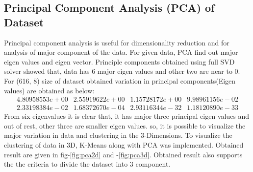 \documentclass[preprint,12pt]{elsarticle}
\begin{document}
						\subsection{Principal Component Analysis (PCA) of Dataset}  
								Principal component analysis is useful for dimensionality reduction and for analysis of major component of the data. For given data, PCA find out major eigen values and eigen vector. Principle components obtained using full SVD solver showed that, data has 6 major eigen values and other two are near to 0. For (616, 8) size of dataset obtained variation in principal components(Eigen values) are obtained as below:
								\[\begin{matrix}\label{mat:eigenvalues}
								    4.80958553e+00 & 2.55919622e+00 & 1.15728172e+00 & 9.98961156e-02 \\
								    2.33198384e-02 & 1.68372670e-04 & 2.93116344e-32 &1.18120890e-33
								\end{matrix}\]							
								From six eigenvalues it is clear that, it has major three principal eigen values and out of rest, other three are smaller eigen values. so, it is possible to visualize the major variation in data and clustering in the 3-Dimensions.
								To visualize the clustering of data in 3D, K-Means along with PCA was implemented. Obtained result are given in fig-\ref{fig:pca2d} and -\ref{fig:pca3d}. Obtained result also supports the the criteria to divide the dataset into 3 component.								
\end{document}
